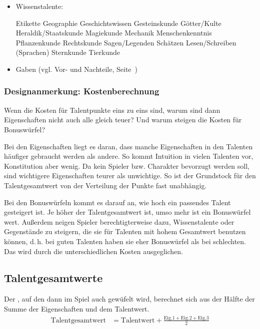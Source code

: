 \begin{itemize}
\item Wissenstalente:
\begin{itemize}
\WTalent Etikette
\WTalent Geographie
\WTalent Geschichtswissen
\WTalent Gesteinskunde
\WTalent Götter/Kulte
\WTalent Heraldik/Staatskunde
\WTalent Magiekunde
\WTalent Mechanik
\WTalent Menschenkenntnis
\WTalent Pflanzenkunde
\WTalent Rechtskunde
\WTalent Sagen/Legenden
\WTalent Schätzen
\WTalent Lesen/Schreiben
\WTalent (Sprachen)
\WTalent Sternkunde
\WTalent Tierkunde
\end{itemize}

\item Gaben (vgl. Vor- und Nachteile, Seite~\pageref{VorUndNachteile})
\end{itemize}

\begin{design}
\subsubsection*{Designanmerkung: Kostenberechnung}
Wenn die Kosten für Talentpunkte eins zu eins sind, warum sind dann Eigenschaften nicht auch alle gleich teuer? Und warum steigen die Kosten für Bonuswürfel?

Bei den Eigenschaften liegt es daran, dass manche Eigenschaften in den Talenten häufiger gebraucht werden als andere. So kommt Intuition in vielen Talenten vor, Konstitution aber wenig. Da kein Spieler bzw. Charakter bevorzugt werden soll, sind wichtigere Eigenschaften teurer als unwichtige. So ist der Grundstock für den Talentgesamtwert von der Verteilung der Punkte fast unabhängig.

Bei den Bonuswürfeln kommt es darauf an, wie hoch ein passendes Talent gesteigert ist. Je höher der Talentgesamtwert ist, umso mehr ist ein Bonuswürfel wert. Außerdem neigen Spieler berechtigterweise dazu, Wissenstalente oder Gegenstände zu steigern, die sie für Talenten mit hohem Gesamtwert benutzen können, d.\,h. bei guten Talenten haben sie eher Bonuswürfel als bei schlechten. Das wird durch die unterschiedlichen Kosten ausgeglichen.
\end{design}



\subsection{Talentgesamtwerte}

Der , auf den dann im Spiel auch gewüfelt wird, berechnet sich aus der Hälfte der Summe der Eigenschaften und dem Talentwert.
\begin{align*}
  \text{Talentgesamtwert} &= \text{Talentwert} + \frac{\text{Eig.1}+\text{Eig.2}+\text{Eig.3}}{2}
\end{align*}

